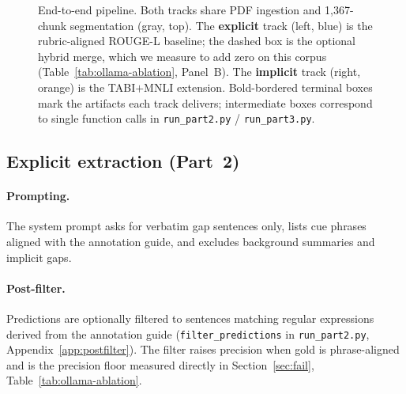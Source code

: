 \documentclass{article}
\begin{document}
\begin{figure}[h]
\caption{End-to-end pipeline. Both tracks share PDF ingestion and 1{,}367-chunk segmentation (gray, top). The \textcolor{blue!55!black}{\textbf{explicit}} track (left, blue) is the rubric-aligned ROUGE-L baseline; the dashed box is the optional hybrid merge, which we measure to add zero on this corpus (Table~\ref{tab:ollama-ablation}, Panel~B). The \textcolor{orange!70!black}{\textbf{implicit}} track (right, orange) is the TABI$+$MNLI extension. Bold-bordered terminal boxes mark the artifacts each track delivers; intermediate boxes correspond to single function calls in \texttt{run\_part2.py} / \texttt{run\_part3.py}.}
\label{fig:pipeline}
\end{figure}

\subsection{Explicit extraction (Part~2)}
\paragraph{Prompting.} The system prompt asks for verbatim gap sentences only, lists cue phrases aligned with the annotation guide, and excludes background summaries and implicit gaps.

\paragraph{Post-filter.} Predictions are optionally filtered to sentences matching regular expressions derived from the annotation guide (\texttt{filter\_predictions} in \texttt{run\_part2.py}, Appendix~\ref{app:postfilter}). The filter raises precision when gold is phrase-aligned and is the precision floor measured directly in Section~\ref{sec:fail}, Table~\ref{tab:ollama-ablation}.
\end{document}
